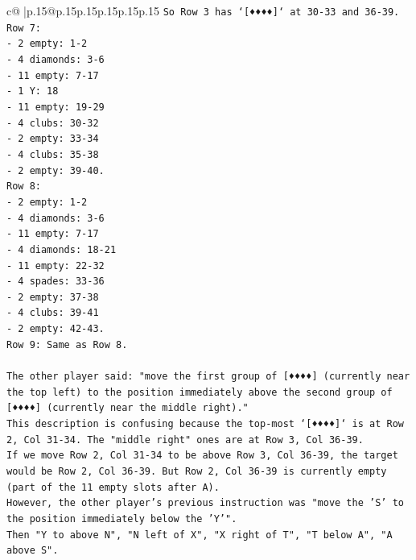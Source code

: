 \documentclass{article}
\begin{document}
{\begin{supertabular}{c@{$\;$}|p{.15\linewidth}@{}p{.15\linewidth}p{.15\linewidth}p{.15\linewidth}p{.15\linewidth}p{.15\linewidth}}
{{{\texttt{So Row 3 has `{[}♦♦♦♦{]}` at 30{-}33 and 36{-}39.} \\
\texttt{Row 7:} \\
\texttt{{-} 2 empty: 1{-}2} \\
\texttt{{-} 4 diamonds: 3{-}6} \\
\texttt{{-} 11 empty: 7{-}17} \\
\texttt{{-} 1 Y: 18} \\
\texttt{{-} 11 empty: 19{-}29} \\
\texttt{{-} 4 clubs: 30{-}32} \\
\texttt{{-} 2 empty: 33{-}34} \\
\texttt{{-} 4 clubs: 35{-}38} \\
\texttt{{-} 2 empty: 39{-}40.} \\
\texttt{Row 8:} \\
\texttt{{-} 2 empty: 1{-}2} \\
\texttt{{-} 4 diamonds: 3{-}6} \\
\texttt{{-} 11 empty: 7{-}17} \\
\texttt{{-} 4 diamonds: 18{-}21} \\
\texttt{{-} 11 empty: 22{-}32} \\
\texttt{{-} 4 spades: 33{-}36} \\
\texttt{{-} 2 empty: 37{-}38} \\
\texttt{{-} 4 clubs: 39{-}41} \\
\texttt{{-} 2 empty: 42{-}43.} \\
\texttt{Row 9: Same as Row 8.} \\
\\ 
\texttt{The other player said: "move the first group of {[}♦♦♦♦{]} (currently near the top left) to the position immediately above the second group of {[}♦♦♦♦{]} (currently near the middle right)."} \\
\texttt{This description is confusing because the top{-}most `{[}♦♦♦♦{]}` is at Row 2, Col 31{-}34. The "middle right" ones are at Row 3, Col 36{-}39.} \\
\texttt{If we move Row 2, Col 31{-}34 to be above Row 3, Col 36{-}39, the target would be Row 2, Col 36{-}39. But Row 2, Col 36{-}39 is currently empty (part of the 11 empty slots after A).} \\
\texttt{However, the other player's previous instruction was "move the 'S' to the position immediately below the 'Y'".} \\
\texttt{Then "Y to above N", "N left of X", "X right of T", "T below A", "A above S".} \\
}}}
\end{supertabular}}
\end{document}
